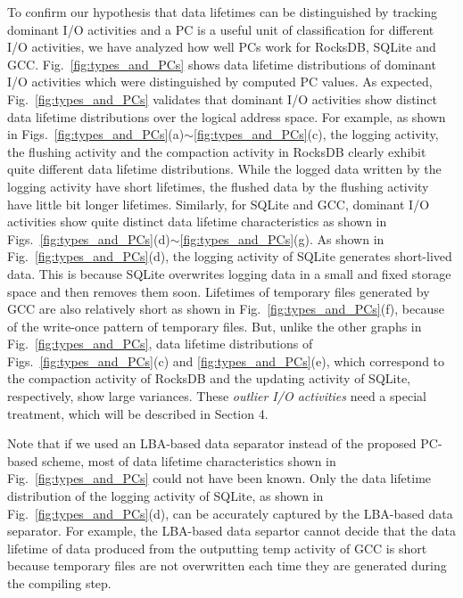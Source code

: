 To confirm our hypothesis that data lifetimes can be distinguished by tracking
dominant I/O activities and a PC is a useful unit of classification for
different I/O activities, we have analyzed how well PCs work for RocksDB,
SQLite and GCC.  Fig.~\ref{fig:types_and_PCs} shows data lifetime distributions
of dominant I/O activities which were distinguished by computed PC values.  As
expected, Fig.~\ref{fig:types_and_PCs} validates that dominant I/O activities
show distinct data lifetime distributions over the logical address space.  For
example, as shown in
Figs.~\ref{fig:types_and_PCs}(a)$\sim$\ref{fig:types_and_PCs}(c), the logging
activity, the flushing activity and the compaction activity in RocksDB clearly
exhibit quite different data lifetime distributions.  While the logged data
written by the logging activity have short lifetimes, the flushed data by the
flushing activity have little bit longer lifetimes.  Similarly, for SQLite and
GCC, dominant I/O activities show quite distinct data lifetime characteristics
as shown in Figs.~\ref{fig:types_and_PCs}(d)$\sim$\ref{fig:types_and_PCs}(g).
As shown in Fig.~\ref{fig:types_and_PCs}(d), the logging activity of SQLite
generates short-lived data.  This is because SQLite overwrites logging data in
a small and fixed storage space and then removes them soon.  Lifetimes of
temporary files generated by GCC are also relatively short as shown in
Fig.~\ref{fig:types_and_PCs}(f), because of the write-once pattern of temporary
files.  But, unlike the other graphs in Fig.~\ref{fig:types_and_PCs}, data
lifetime distributions of Figs.~\ref{fig:types_and_PCs}(c) and
\ref{fig:types_and_PCs}(e), which correspond to the compaction activity of
RocksDB and the updating activity of SQLite, respectively, show large
variances.  These {\it outlier I/O activities} need a special treatment, which
will be described in Section 4.

Note that if we used an LBA-based data separator instead of the proposed
PC-based scheme, most of data lifetime characteristics shown in
Fig.~\ref{fig:types_and_PCs} could not have been known.  Only the data lifetime
distribution of the logging activity of SQLite, as shown in
Fig.~\ref{fig:types_and_PCs}(d), can be accurately captured by the LBA-based
data separator.  For example, the LBA-based data separtor cannot decide that
the data lifetime of data produced from the outputting temp activity of GCC is
short because temporary files are not overwritten each time they
are generated during the compiling step. 


\vspace{-10pt}
